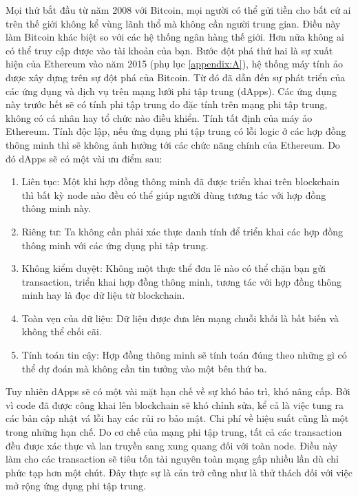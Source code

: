 \documentclass[../main.tex]{subfiles}
\begin{document}
Mọi thứ bắt đầu từ năm 2008 với Bitcoin, mọi người có thể gửi tiền cho bất cứ ai trên thế giới không kể vùng lãnh thổ mà không cần người trung gian. Điều này làm Bitcoin khác biệt so với các hệ thống ngân hàng thế giới. Hơn nữa không ai có thể truy cập được vào tài khoản của bạn. Bước đột phá thứ hai là sự xuất hiện của Ethereum vào năm 2015 (phụ lục \ref{appendix:A}), hệ thống máy tính ảo được xây dựng trên sự đột phá của Bitcoin. Từ đó đã dẫn đến sự phát triển của các ứng dụng và dịch vụ trên mạng lưới phi tập trung (dApps). Các ứng dụng này trước hết sẽ có tính phi tập trung do đặc tính trên mạng phi tập trung, không có cá nhân hay tổ chức nào điều khiển. Tính tất định của máy ảo Ethereum. Tính độc lập, nếu ứng dụng phi tập trung có lỗi logic ở các hợp đồng thông minh thì sẽ không ảnh hưởng tới các chức năng chính của Ethereum. Do đó dApps sẽ có một vài ưu điểm sau:
\begin{enumerate}
    \item Liên tục: Một khi hợp đồng thông minh đã được triển khai trên blockchain thì bất kỳ node nào đều có thể giúp người dùng tương tác với hợp đồng thông minh này.
    \item Riêng tư: Ta không cần phải xác thực danh tính để triển khai các hợp đồng thông minh với các ứng dụng phi tập trung.
    \item Không kiểm duyệt: Không một thực thể đơn lẻ nào có thể chặn bạn gửi transaction, triển khai hợp đồng thông minh, tương tác với hợp đồng thông minh hay là đọc dữ liệu từ blockchain.
    \item Toàn vẹn của dữ liệu: Dữ liệu được đưa lên mạng chuỗi khối là bất biến và không thể chối cãi. 
    \item Tính toán tin cậy: Hợp đồng thông minh sẽ tính toán đúng theo những gì có thể dự đoán mà không cần tin tưởng vào một bên thứ ba.
\end{enumerate}

Tuy nhiên dApps sẽ có một vài mặt hạn chế về sự khó bảo trì, khó nâng cấp. Bởi vì code đã được công khai lên blockchain sẽ khó chỉnh sửa, kể cả là việc tung ra các bản cập nhật vá lỗi hay các rủi ro bảo mật. Chi phí về hiệu suất cũng là một trong những hạn chế. Do cơ chế của mạng phi tập trung, tất cả các transaction đều được xác thực và lan truyền sang xung quang đối với toàn node. Điều này làm cho các transaction sẽ tiêu tốn tài nguyên toàn mạng gấp nhiều lần dù chỉ phức tạp hơn một chút. Đây thực sự là cản trở cũng như là thử thách đối với việc mở rộng ứng dụng phi tập trung.
\end{document}
